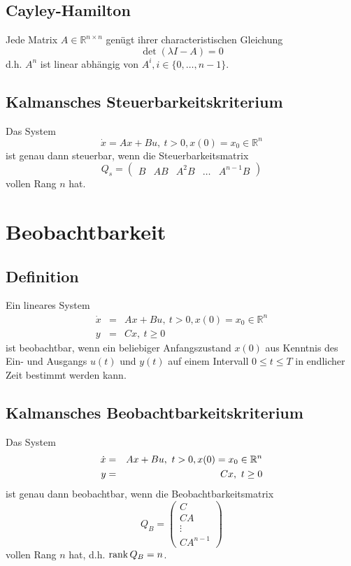 \subsection{Cayley-Hamilton}
Jede Matrix $A \in \mathbb{R}^{n \times n}$ genügt ihrer characteristischen Gleichung
\begin{equation}
    \det(\lambda I - A) = 0
\end{equation}
d.h. $A^n$ ist linear abhängig von $A^i, i \in \{0, \ldots, n-1\}$.

\subsection{Kalmansches Steuerbarkeitskriterium}
Das System
\begin{equation}
    \dot{x} = Ax + Bu,\ t>0, x(0)=x_0\in \mathbb{R}^n
\end{equation}
ist genau dann steuerbar, wenn die Steuerbarkeitsmatrix
\begin{equation}
    Q_s = \begin{pmatrix}
        B & AB & A^2 B & \ldots & A^{n-1} B
    \end{pmatrix}
\end{equation}
vollen Rang $n$ hat.

\section{Beobachtbarkeit}
\subsection{Definition}
Ein lineares System
\begin{eqnarray}
    \dot{x} &=& Ax + Bu,\ t>0, x(0)=x_0\in \mathbb{R}^n \\
    y &=& C x,\ t \geq 0
\end{eqnarray}
ist beobachtbar, wenn ein beliebiger Anfangszustand $x(0)$ aus Kenntnis des Ein- und
Ausgangs $u(t)$ und $y(t)$ auf einem Intervall $0\leq t \leq T$ in endlicher Zeit
bestimmt werden kann.

\subsection{Kalmansches Beobachtbarkeitskriterium}
Das System
\begin{eqnarray}
    \dot{x} &=& Ax + Bu,\ t>0, x(0)=x_0\in \mathbb{R}^n \\
    y &=& C x,\ t \geq 0 \\
\end{eqnarray}
ist genau dann beobachtbar, wenn die Beobachtbarkeitsmatrix
\begin{equation}
    Q_B = \begin{pmatrix}
        C \\ C A \\ \vdots \\ C A^{n-1}
    \end{pmatrix}
\end{equation}
vollen Rang $n$ hat, d.h. $\operatorname*{rank}{Q_B} = n$.

